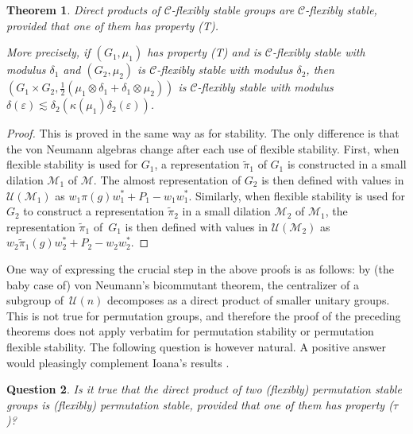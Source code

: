 \documentclass[10pt]{amsart}
\theoremstyle{plain}
\newtheorem{theorem}{Theorem}[section]
\newtheorem{question}[theorem]{Question}
\theoremstyle{definition}
\newcommand{\cM}{\mathcal{M}}
\newcommand{\vn}{\mathcal{C}}
\newcommand{\cU}{\mathcal{U}}
\begin{document}
\begin{theorem}\label{thm:flexible_stability_direct_product} Direct products of $\vn$-flexibly stable groups are $\vn$-flexibly stable, provided that one of them has property (T).

More precisely, if $(G_1,\mu_1)$ has property (T) and is $\vn$-flexibly stable with modulus $\delta_1$ and $(G_2,\mu_2)$ is $\vn$-flexibly stable with modulus $\delta_2$, then $(G_1 \times G_2,\frac{1}{2}(\mu_1 \otimes \delta_1 + \delta_1 \otimes \mu_2))$ is $\vn$-flexibly stable with modulus $\delta(\varepsilon) \lesssim \delta_2(\kappa(\mu_1) \delta_2(\varepsilon))$.
\end{theorem}
\begin{proof}
This is proved in the same way as for stability. The only difference is that the von Neumann algebras change after each use of flexible stability. First, when flexible stability is used for $G_1$, a representation $\tilde{\pi}_1$ of $G_1$ is constructed in a small dilation $\cM_1$ of $\cM$. The almost representation of $G_2$ is then defined with values in $\cU(\cM_1)$ as $w_1 \pi(g) w_1^* +P_1 - w_1w_1^*$. Similarly, when flexible stability is used for $G_2$ to construct a representation $\tilde{\pi}_2$ in a small dilation $\cM_2$ of $\cM_1$, the representation $\tilde{\pi}_1$ of~$G_1$ is then defined with values in $\cU(\cM_2)$ as
$w_2 \tilde{\pi}_1(g) w_2^* +P_2 - w_2w_2^*$.
\end{proof}

One way of expressing the crucial step in the above proofs is as follows: by (the baby case of) von Neumann's bicommutant theorem, the centralizer of a subgroup of~$\cU(n)$ decomposes as a direct product of smaller unitary groups. This is not true for permutation groups, and therefore the proof of the preceding theorems does not apply verbatim for permutation stability or permutation flexible stability. The following question is however natural. A positive answer would pleasingly complement Ioana's results \cite{MR4134896}.

\begin{question}
Is it true that the direct product of two (flexibly) permutation stable groups is (flexibly) permutation stable, provided that one of them has property ($\tau$)?
\end{question}
\end{document}
